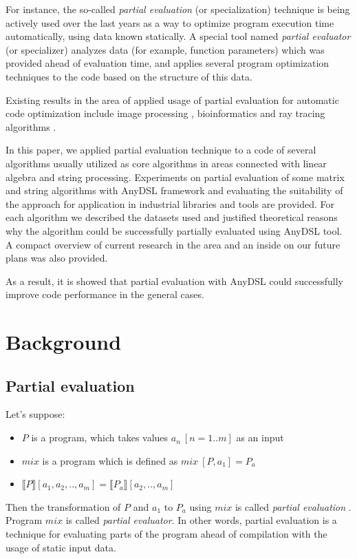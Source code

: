 \documentclass[conference]{IEEEtran}
\begin{document}
For instance, the so-called \textit{partial evaluation} (or specialization) \cite{jones1993partial} technique is being actively used over the last years as a way to optimize program execution time automatically, using data known statically. A special tool named \textit{partial evaluator} (or specializer) analyzes data (for example, function parameters) which was provided ahead of evaluation time, and applies several program optimization techniques to the code based on the structure of this data. 


Existing results in the area of applied usage of partial evaluation for automatic code optimization include image processing \cite{leissa2018anydsl}, bioinformatics \cite{muller2020anyseq} and ray tracing algorithms \cite{perard2019rodent}.


In this paper, we applied partial evaluation technique to a code of several algorithms usually utilized as core algorithms in areas connected with linear algebra and string processing. Experiments on partial evaluation of some matrix and string algorithms with AnyDSL \cite{leissa2018anydsl} framework and evaluating the suitability of the approach for application in industrial libraries and tools are provided. For each algorithm we described the datasets used and justified theoretical reasons why the algorithm could be successfully partially evaluated using AnyDSL tool. A compact overview of current research in the area and an inside on our future plans was also provided.

As a result, it is showed that partial evaluation with AnyDSL could successfully improve code performance in the general cases.


\section{Background}

\subsection{Partial evaluation}

Let's suppose:

\begin{itemize}
	\item $P$ is a program, which takes values $a_n\ [n=1..m]$ as an input
	\item $mix$ is a program which is defined as $mix\ [P, a_1] = P_a$
	\item $\llbracket P \rrbracket [a_1, a_2, .., a_m] = \llbracket P_a \rrbracket [a_2, .., a_m]$
\end{itemize}
Then the transformation of $P$ and $a_1$ to $P_a$ using $mix$ is called \textit{partial evaluation} \cite{jones1993partial}. Program $mix$ is called \textit{partial evaluator}. In other words, partial evaluation is a technique for evaluating parts of the program ahead of compilation with the usage of static input data.
\end{document}
